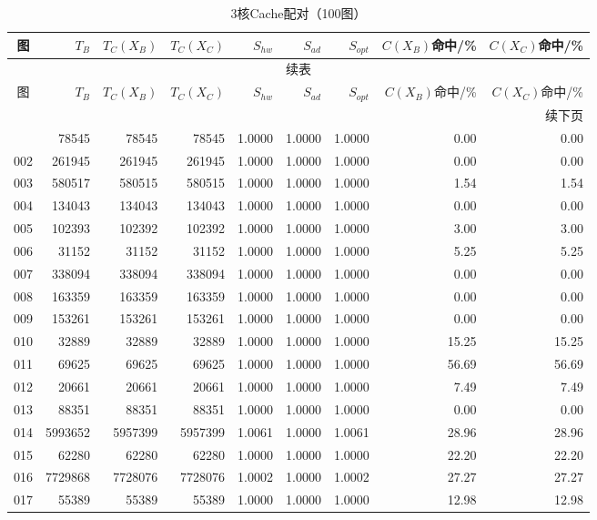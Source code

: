 \begin{longtable}{crrrrrrrr}
\caption{3核Cache配对（100图）}\label{tab:cache-detail-3}\\
\toprule
图 & $T_B$ & $T_C(X_B)$ & $T_C(X_C)$ & $S_{hw}$ & $S_{ad}$ & $S_{opt}$ & $C(X_B)$命中/\% & $C(X_C)$命中/\% \\
\midrule
\endfirsthead
\multicolumn{9}{c}{续表}\\
\toprule
图 & $T_B$ & $T_C(X_B)$ & $T_C(X_C)$ & $S_{hw}$ & $S_{ad}$ & $S_{opt}$ & $C(X_B)$命中/\% & $C(X_C)$命中/\% \\
\midrule
\endhead
\midrule\multicolumn{9}{r}{续下页}\\
\endfoot
\bottomrule
\endlastfoot
001 & 78545 & 78545 & 78545 & 1.0000 & 1.0000 & 1.0000 & 0.00 & 0.00 \\
002 & 261945 & 261945 & 261945 & 1.0000 & 1.0000 & 1.0000 & 0.00 & 0.00 \\
003 & 580517 & 580515 & 580515 & 1.0000 & 1.0000 & 1.0000 & 1.54 & 1.54 \\
004 & 134043 & 134043 & 134043 & 1.0000 & 1.0000 & 1.0000 & 0.00 & 0.00 \\
005 & 102393 & 102392 & 102392 & 1.0000 & 1.0000 & 1.0000 & 3.00 & 3.00 \\
006 & 31152 & 31152 & 31152 & 1.0000 & 1.0000 & 1.0000 & 5.25 & 5.25 \\
007 & 338094 & 338094 & 338094 & 1.0000 & 1.0000 & 1.0000 & 0.00 & 0.00 \\
008 & 163359 & 163359 & 163359 & 1.0000 & 1.0000 & 1.0000 & 0.00 & 0.00 \\
009 & 153261 & 153261 & 153261 & 1.0000 & 1.0000 & 1.0000 & 0.00 & 0.00 \\
010 & 32889 & 32889 & 32889 & 1.0000 & 1.0000 & 1.0000 & 15.25 & 15.25 \\
011 & 69625 & 69625 & 69625 & 1.0000 & 1.0000 & 1.0000 & 56.69 & 56.69 \\
012 & 20661 & 20661 & 20661 & 1.0000 & 1.0000 & 1.0000 & 7.49 & 7.49 \\
013 & 88351 & 88351 & 88351 & 1.0000 & 1.0000 & 1.0000 & 0.00 & 0.00 \\
014 & 5993652 & 5957399 & 5957399 & 1.0061 & 1.0000 & 1.0061 & 28.96 & 28.96 \\
015 & 62280 & 62280 & 62280 & 1.0000 & 1.0000 & 1.0000 & 22.20 & 22.20 \\
016 & 7729868 & 7728076 & 7728076 & 1.0002 & 1.0000 & 1.0002 & 27.27 & 27.27 \\
017 & 55389 & 55389 & 55389 & 1.0000 & 1.0000 & 1.0000 & 12.98 & 12.98 \\

\end{longtable}
